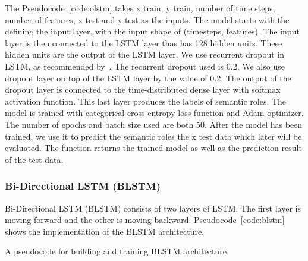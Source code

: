 The Pseudocode~\ref{code:olstm} takes x train, y train, number of time steps, number of features, x test and y test as the inputs. The model starts with the defining the input layer, with the input shape of (timesteps, features). The input layer is then connected to the LSTM layer thas has 128 hidden units. These hidden units are the output of the LSTM layer. We use recurrent dropout in LSTM, as recommended by~\cite{he2017deep}. The recurrent dropout used is 0.2. We also use dropout layer on top of the LSTM layer by the value of 0.2. The output of the dropout layer is connected to the time-distributed dense layer with softmax activation function. This last layer produces the labels of semantic roles. The model is trained with categorical cross-entropy loss function and Adam optimizer. The number of epochs and batch size used are both 50. After the model has been trained, we use it to predict the semantic roles the x test data which later will be evaluated. The function returns the trained model as well as the prediction result of the test data.

\subsubsection{Bi-Directional LSTM (BLSTM)}
Bi-Directional LSTM (BLSTM) consists of two layers of LSTM. The first layer is moving forward and the other is moving backward. Pseudocode~\ref{code:blstm} shows the implementation of the BLSTM architecture.

\begin{kode}
	
	
	\caption{A pseudocode for building and training BLSTM architecture}
	\label{code:blstm}
\end{kode}


